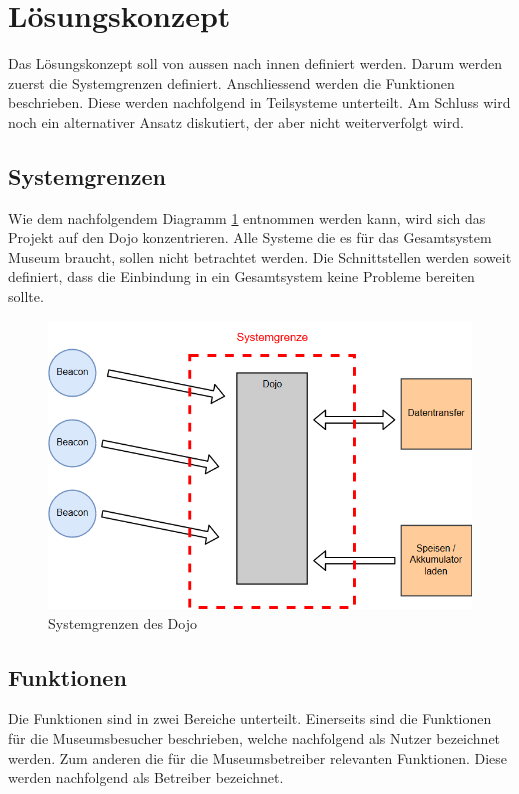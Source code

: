 \section{Lösungskonzept}
Das Lösungskonzept soll von aussen nach innen definiert werden. Darum werden zuerst die Systemgrenzen definiert. Anschliessend werden die Funktionen beschrieben. Diese werden nachfolgend in Teilsysteme unterteilt. Am Schluss wird noch ein alternativer Ansatz diskutiert, der aber nicht weiterverfolgt wird.

\subsection{Systemgrenzen}
Wie dem nachfolgendem Diagramm \ref{fig:systemgrenzen} entnommen werden kann, wird sich das Projekt auf den Dojo konzentrieren. Alle Systeme die es für das Gesamtsystem Museum braucht, sollen nicht betrachtet werden. Die Schnittstellen werden soweit definiert, dass die Einbindung in ein Gesamtsystem keine Probleme bereiten sollte.

\begin{figure}[H]
\begin{center}
	\includegraphics[width=140mm]{data/Loesungskonzept_Systemgrenzen.png}
	\caption{Systemgrenzen des Dojo} %
	\label{fig:systemgrenzen}
\end{center}
\end{figure}

\subsection{Funktionen}
Die Funktionen sind in zwei Bereiche unterteilt. Einerseits sind die Funktionen für die Museumsbesucher beschrieben, welche nachfolgend als Nutzer bezeichnet werden. Zum anderen die für die Museumsbetreiber relevanten Funktionen. Diese werden nachfolgend als Betreiber bezeichnet.
